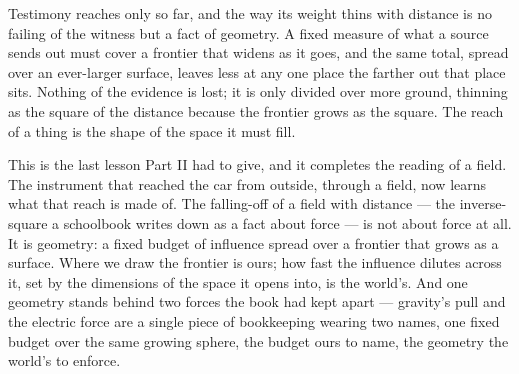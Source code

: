%
%
%
%

\noindent Testimony reaches only so far, and the way its weight thins with distance is no failing of the
witness but a fact of geometry. A fixed measure of what a source sends out must cover a frontier that widens as
it goes, and the same total, spread over an ever-larger surface, leaves less at any one place the farther out
that place sits. Nothing of the evidence is lost; it is only divided over more ground, thinning as the square of
the distance because the frontier grows as the square. The reach of a thing is the shape of the space it must
fill.

This is the last lesson Part II had to give, and it completes the reading of a field. The instrument that
reached the car from outside, through a field, now learns what that reach is made of. The falling-off of a
field with distance --- the inverse-square a schoolbook writes down as a fact about force --- is not about force
at all. It is geometry: a fixed budget of influence spread over a frontier that grows as a surface. Where we
draw the frontier is ours; how fast the influence dilutes across it, set by the dimensions of the space it
opens into, is the world's. And one geometry stands behind two forces the book had kept apart --- gravity's
pull and the electric force are a single piece of bookkeeping wearing two names, one fixed budget over the same
growing sphere, the budget ours to name, the geometry the world's to enforce.

